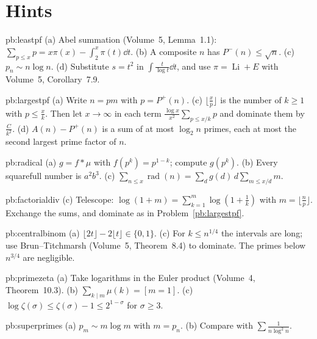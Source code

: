 \section{Hints}

\begin{hint}{pb:leastpf}
(a) Abel summation (Volume~5, Lemma~1.1): $\sum_{p\le x}p=x\pi(x)-\int_2^x\pi(t)\dd t$. (b) A composite $n$ has $P^-(n)\le\sqrt n$. (c) $p_n\sim n\log n$. (d) Substitute $s=t^2$ in
$\int\frac t{\log t}\dd t$, and use $\pi=\operatorname{Li}+E$ with Volume~5, Corollary~7.9.
\end{hint}

\begin{hint}{pb:largestpf}
(a) Write $n=pm$ with $p=P^+(n)$. (c) $\lfloor\frac xp\rfloor$ is the number of $k\ge1$ with $p\le\frac xk$. Then let $x\to\infty$ in each term $\frac{\log x}{x^2}\sum_{p\le x/k}p$ and dominate them by $\frac C{k^2}$.
(d) $A(n)-P^+(n)$ is a sum of at most $\log_2n$ primes, each at most the second largest prime factor of $n$.
\end{hint}

\begin{hint}{pb:radical}
(a) $g=f*\mu$ with $f(p^k)=p^{1-k}$; compute $g(p^k)$. (b) Every squarefull number is $a^2b^3$. (c) $\sum_{n\le x}\operatorname{rad}(n)=\sum_dg(d)\,d\sum_{m\le x/d}m$.
\end{hint}

\begin{hint}{pb:factorialdiv}
(c) Telescope: $\log(1+m)=\sum_{k=1}^m\log(1+\frac1k)$ with $m=\lfloor\frac np\rfloor$. Exchange the sums, and dominate as in Problem~\ref{pb:largestpf}.
\end{hint}

\begin{hint}{pb:centralbinom}
(a) $\lfloor2t\rfloor-2\lfloor t\rfloor\in\{0,1\}$. (c) For $k\le n^{1/4}$ the intervals are long; use Brun--Titchmarsh (Volume~5, Theorem~8.4) to dominate. The primes below
$n^{3/4}$ are negligible.
\end{hint}

\begin{hint}{pb:primezeta}
(a) Take logarithms in the Euler product (Volume~4, Theorem~10.3). (b) $\sum_{k\mid m}\mu(k)=[m=1]$. (c) $\log\zeta(\sigma)\le\zeta(\sigma)-1\le2^{1-\sigma}$ for $\sigma\ge3$.
\end{hint}

\begin{hint}{pb:superprimes}
(a) $p_m\sim m\log m$ with $m=p_n$. (b) Compare with $\sum\frac1{n\log^2n}$.
\end{hint}

